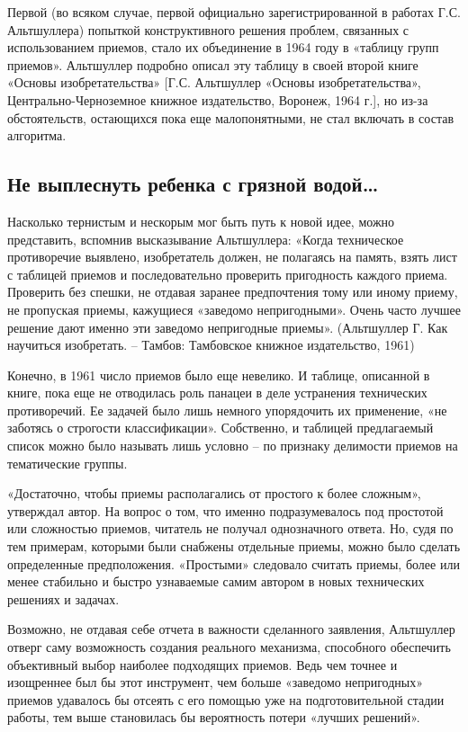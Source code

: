 \documentclass[11pt,a4paper]{article}
\begin{document}
Первой (во всяком случае, первой официально зарегистрированной в работах
Г.С. Альтшуллера) попыткой конструктивного решения проблем, связанных с
использованием приемов, стало их объединение в 1964 году в «таблицу групп
приемов». Альтшуллер подробно описал эту таблицу в своей второй книге «Основы
изобретательства» [Г.С. Альтшуллер «Основы изобретательства»,
  Центрально-Черноземное книжное издательство, Воронеж, 1964 г.], но из-за
обстоятельств, остающихся пока еще малопонятными, не стал включать в состав
алгоритма.

\subsection*{Не выплеснуть ребенка с грязной водой…}

Насколько тернистым и нескорым мог быть путь к новой идее, можно представить,
вспомнив высказывание Альтшуллера: «Когда техническое противоречие выявлено,
изобретатель должен, не полагаясь на память, взять лист с таблицей приемов и
последовательно проверить пригодность каждого приема. Проверить без спешки, не
отдавая заранее предпочтения тому или иному приему, не пропуская приемы,
кажущиеся «заведомо непригодными». Очень часто лучшее решение дают именно эти
заведомо непригодные приемы». (Альтшуллер Г. Как научиться изобретать. --
Тамбов: Тамбовское книжное издательство, 1961)

Конечно, в 1961 число приемов было еще невелико. И таблице, описанной в книге,
пока еще не отводилась роль панацеи в деле устранения технических
противоречий. Ее задачей было лишь немного упорядочить их применение, «не
заботясь о строгости классификации». Собственно, и таблицей предлагаемый
список можно было называть лишь условно -- по признаку делимости приемов на
тематические группы.

«Достаточно, чтобы приемы располагались от простого к более сложным»,
утверждал автор. На вопрос о том, что именно подразумевалось под простотой или
сложностью приемов, читатель не получал однозначного ответа. Но, судя по тем
примерам, которыми были снабжены отдельные приемы, можно было сделать
определенные предположения. «Простыми» следовало считать приемы, более или
менее стабильно и быстро узнаваемые самим автором в новых технических решениях
и задачах.

Возможно, не отдавая себе отчета в важности сделанного заявления, Альтшуллер
отверг саму возможность создания реального механизма, способного обеспечить
объективный выбор наиболее подходящих приемов. Ведь чем точнее и изощреннее
был бы этот инструмент, чем больше «заведомо непригодных» приемов удавалось бы
отсеять с его помощью уже на подготовительной стадии работы, тем выше
становилась бы вероятность потери «лучших решений».
\end{document}
